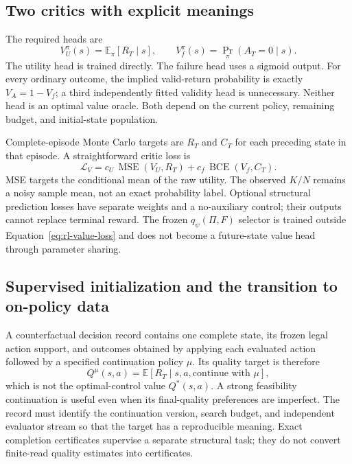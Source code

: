 \documentclass[11pt,a4paper]{article}
\newcommand{\E}{\mathbb{E}}
\theoremstyle{definition}\newtheorem{definition}[proposition]{Definition}
\begin{document}
\subsection{Two critics with explicit meanings}

The required heads are
\begin{equation}
 V_U^\pi(s)=\E_\pi[R_T\mid s],\qquad
 V_f^\pi(s)=\Pr_\pi(A_T=0\mid s).
 \label{eq:rl-critics}
\end{equation}
The utility head is trained directly. The failure head uses a sigmoid output. For every ordinary
outcome, the implied valid-return probability is exactly \(V_A=1-V_f\); a third independently
fitted validity head is unnecessary. Neither head is an optimal value oracle. Both depend on the
current policy, remaining budget, and initial-state population.

Complete-episode Monte Carlo targets are \(R_T\) and \(C_T\) for each preceding state in that
episode. A straightforward critic loss is
\begin{equation}
 \mathcal L_V=
 c_U\,\operatorname{MSE}(V_U,R_T)
 +c_f\,\operatorname{BCE}(V_f,C_T).
 \label{eq:rl-value-loss}
\end{equation}
MSE targets the conditional mean of the raw utility. The observed \(K/N\) remains a noisy sample
mean, not an exact probability label. Optional structural prediction losses have separate weights
and a no-auxiliary control; their outputs cannot replace terminal reward. The frozen
\(q_\psi(\Pi,F)\) selector is trained outside Equation~\eqref{eq:rl-value-loss} and does not become
a future-state value head through parameter sharing.

\subsection{Supervised initialization and the transition to on-policy data}

A counterfactual decision record contains one complete state, its frozen legal action support, and
outcomes obtained by applying each evaluated action followed by a specified continuation policy
\(\mu\). Its quality target is therefore
\[
 Q^\mu(s,a)=\E[R_T\mid s,a,\text{continue with }\mu],
\]
which is not the optimal-control value \(Q^*(s,a)\). A strong feasibility continuation is useful
even when its final-quality preferences are imperfect. The record must identify the continuation
version, search budget, and independent evaluator stream so that the target has a reproducible
meaning. Exact completion certificates supervise a separate structural task; they do not convert
finite-read quality estimates into certificates.
\end{document}
